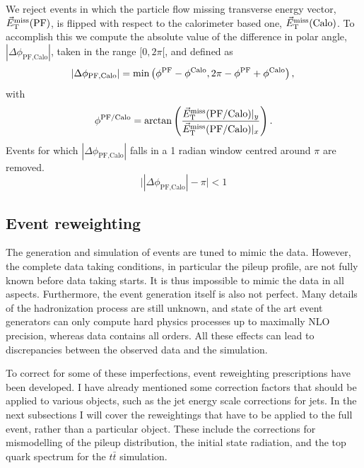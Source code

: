 We reject events in which the particle flow missing transverse energy vector, ${\vec E}_{\mathrm{T}}^{\text{miss}}(\text{PF})$,
is flipped with respect to the calorimeter based one, ${\vec E}_{\mathrm{T}}^{\text{miss}}(\text{Calo})$. 
To accomplish this we compute the absolute value of the difference in polar angle,
 $|\Delta\phi_{\text{PF,Calo}}|$, taken in the range $[0,2\pi[$, and defined as
\begin{equation}
|\Delta\phi_{\text{PF,Calo}}| = \min \left ( \phi^{\text{PF}} - \phi^{\text{Calo}},   2\pi -
\phi^{\text{PF}} + \phi^{\text{Calo}} \right) ,\\
\end{equation}
with 
\begin{equation}
\phi^{\text{PF/Calo}} = \textrm{arctan} \left( \frac{{\vec E}_{\mathrm{T}}^{\text{miss}}(\text{PF/Calo})|_y}
{{\vec E}_{\mathrm{T}}^{\text{miss}}(\text{PF/Calo})|_x} \right) . \\
\end{equation}
Events for which $|\Delta\phi_{\text{PF,Calo}}|$ falls in a 1 radian window centred around $\pi$
are removed. 
\begin{equation}
\bigl| |\Delta\phi_{\text{PF,Calo}}| - \pi \bigr| < 1
\label{eqn:dphicut}
\end{equation}


\subsection{Event reweighting \label{sec:event_reweighting}}

The generation and simulation of events are tuned to mimic the data. However, the complete data
taking conditions, in particular the pileup profile, are not fully known before data
taking starts. It is thus impossible to mimic the data in all aspects. 
Furthermore, the event generation itself is also not perfect. 
Many details of the hadronization process are still unknown, and state of the art event
generators can only compute hard physics processes up to maximally NLO precision,
whereas data contains all orders.  
All these effects can lead to discrepancies between the observed data and the simulation.  

To correct for some of these imperfections, event reweighting prescriptions have been developed. I
have already mentioned some correction factors that should be applied to various objects, such as
the jet energy scale corrections for jets. 
In the next subsections I will cover the reweightings that have to be applied to the full event,
rather than a particular object. These include the corrections for mismodelling of the pileup
distribution, the initial state radiation, and the top quark \pt spectrum for the
$t\bar{t}$ simulation.


